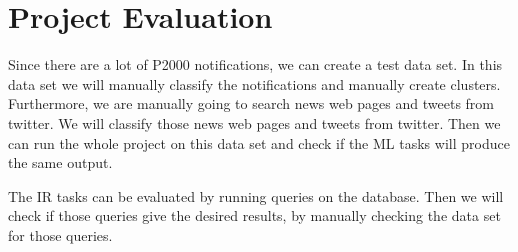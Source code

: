 \section{Project Evaluation}
Since there are a lot of P2000 notifications, we can create a test data set. 
In this data set we will manually classify the notifications and manually create clusters. 
Furthermore, we are manually going to search news web pages and tweets from twitter.
We will classify those news web pages and tweets from twitter. 
Then we can run the whole project on this data set  and check if the ML tasks will produce the same output.

The IR tasks can be evaluated by running queries on the database. 
Then we will check if those queries give the desired results, by manually checking the data set for those queries.
